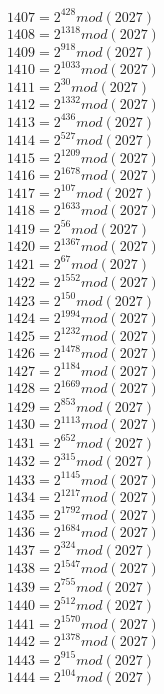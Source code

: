 \documentclass[12pt, letterpaper]{article}
\begin{document}
\begin{itemize}
\begin{multicols}{3}
$1407= 2^{428} mod (2027)$\\
$1408= 2^{1318} mod (2027)$\\
$1409= 2^{918} mod (2027)$\\
$1410= 2^{1033} mod (2027)$\\
$1411= 2^{30} mod (2027)$\\
$1412= 2^{1332} mod (2027)$\\
$1413= 2^{436} mod (2027)$\\
$1414= 2^{527} mod (2027)$\\
$1415= 2^{1209} mod (2027)$\\
$1416= 2^{1678} mod (2027)$\\
$1417= 2^{107} mod (2027)$\\
$1418= 2^{1633} mod (2027)$\\
$1419= 2^{56} mod (2027)$\\
$1420= 2^{1367} mod (2027)$\\
$1421= 2^{67} mod (2027)$\\
$1422= 2^{1552} mod (2027)$\\
$1423= 2^{150} mod (2027)$\\
$1424= 2^{1994} mod (2027)$\\
$1425= 2^{1232} mod (2027)$\\
$1426= 2^{1478} mod (2027)$\\
$1427= 2^{1184} mod (2027)$\\
$1428= 2^{1669} mod (2027)$\\
$1429= 2^{853} mod (2027)$\\
$1430= 2^{1113} mod (2027)$\\
$1431= 2^{652} mod (2027)$\\
$1432= 2^{315} mod (2027)$\\
$1433= 2^{1145} mod (2027)$\\
$1434= 2^{1217} mod (2027)$\\
$1435= 2^{1792} mod (2027)$\\
$1436= 2^{1684} mod (2027)$\\
$1437= 2^{324} mod (2027)$\\
$1438= 2^{1547} mod (2027)$\\
$1439= 2^{755} mod (2027)$\\
$1440= 2^{512} mod (2027)$\\
$1441= 2^{1570} mod (2027)$\\
$1442= 2^{1378} mod (2027)$\\
$1443= 2^{915} mod (2027)$\\
$1444= 2^{104} mod (2027)$\\

\end{multicols}
\end{itemize}
\end{document}
